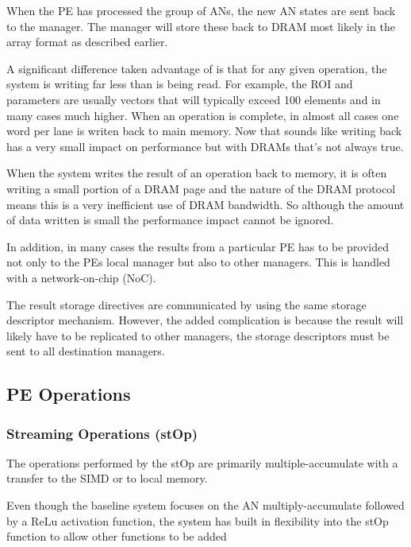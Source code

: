 \documentclass[journal]{IEEEtran}
\begin{document}
When the PE has processed the group of ANs, the new AN states are sent back to the manager. The manager will store these back to DRAM most likely in the array format as described earlier.

A significant difference taken advantage of is that for any given operation, the system is writing far less than is being read. For example, the ROI and parameters are usually vectors that will typically exceed 100 elements and in many cases much higher. When an operation is complete, in almost all cases one word per lane is writen back to main memory. 
Now that sounds like writing back has a very small impact on performance but with DRAMs that's not always true.

When the system writes the result of an operation back to memory, it is often writing a small portion of a DRAM page and the nature of the DRAM protocol means this is a very inefficient use of DRAM bandwidth. So although the amount of data written is small the performance impact cannot be ignored.

In addition, in many cases the results from a particular PE has to be provided not only to the PEs local manager but also to other managers. This is handled with a network-on-chip (NoC).

The result storage directives are communicated by using the same storage descriptor mechanism. However, the added complication is because the result will likely have to be replicated to other managers, the storage descriptors must be sent to all destination managers.


\subsection{PE Operations}
\label{sec:PE Operations}

\subsubsection{Streaming Operations (stOp)}
\label{ssec:streamingOps}
The operations performed by the stOp are primarily multiple-accumulate with a transfer to the SIMD or to local memory.

Even though the baseline system focuses on the AN multiply-accumulate followed by a ReLu activation function, the system has built in flexibility into the stOp function to allow other functions to be added
\end{document}
